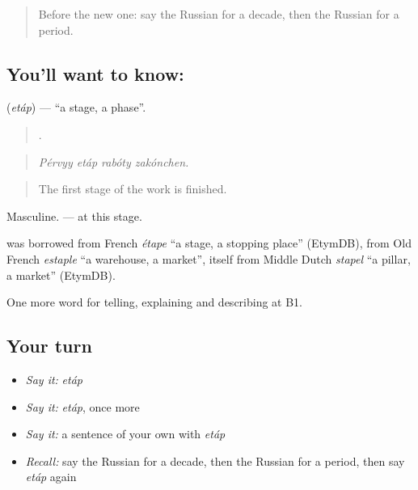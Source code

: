 \label{lesson:RU-C276-etap}



\begin{quote}
Before the new one: say the Russian for a decade, then the Russian for a period.
\end{quote}

\subsection*{You'll want to know: }
\textbf{} (\emph{etáp}) — \textquotedblleft{}a stage, a phase\textquotedblright{}.

\begin{quote}
   .
\end{quote}

\begin{quote}
\emph{Pérvyy etáp rabóty zakónchen.}
\end{quote}

\begin{quote}
The first stage of the work is finished.
\end{quote}

Masculine. \emph{  } — at this stage.

\begin{cousinweb}
\emph{} was borrowed from French \emph{étape} \textquotedblleft{}a stage, a stopping place\textquotedblright{} (EtymDB), from Old French \emph{estaple} \textquotedblleft{}a warehouse, a market\textquotedblright{}, itself from Middle Dutch \emph{stapel} \textquotedblleft{}a pillar, a market\textquotedblright{} (EtymDB).
\end{cousinweb}

\begin{grammarlens}[title={What you've built}]
One more word for telling, explaining and describing at B1.
\end{grammarlens}

\subsection*{Your turn}
\begin{itemize}
\raggedright
  \item \emph{Say it:} \emph{etáp}
  \item \emph{Say it:} \emph{etáp}, once more
  \item \emph{Say it:} a sentence of your own with \emph{etáp}
  \item \emph{Recall:} say the Russian for a decade, then the Russian for a period, then say \emph{etáp} again
\end{itemize}

